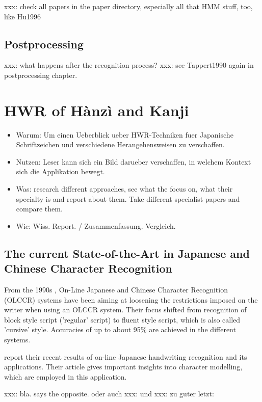 xxx: check all papers in the paper directory, especially all that HMM stuff,
too, like Hu1996

\subsection{Postprocessing}
\label{sec:postprocessing}

xxx: what happens after the recognition process?
xxx: see Tappert1990 again in postprocessing chapter.

\section{HWR of Hànzì and Kanji}
\begin{itemize}
\item Warum: Um einen Ueberblick ueber HWR-Techniken fuer Japanische 
  Schriftzeichen und verschiedene Herangehensweisen zu verschaffen.
\item Nutzen: Leser kann sich ein Bild darueber verschaffen,
  in welchem Kontext sich die Applikation bewegt.
\item Was: research different approaches, see what the focus on, 
  what their specialty is and report about them. Take different specialist 
  papers and compare them.
\item Wie: Wiss. Report. / Zusammenfassung. Vergleich. 
\end{itemize}

\subsection{The current State-of-the-Art in Japanese and Chinese Character Recognition}
From the 1990s  , On-Line Japanese and Chinese Character Recognition 
(OLCCR) systems have been aiming at loosening the restrictions imposed on 
the writer when using an OLCCR system. Their focus shifted from recognition 
of block style script ('regular' script) to fluent style script, 
which is also called 'cursive' style. Accuracies of up to about 95\% are
achieved in the different systems.

\cite{Nakagawa2008} report their recent results of on-line Japanese 
handwriting recognition and its applications. Their article gives 
important insights into character modelling, which are employed in 
this application.

xxx: bla.  says the opposite. \cite{ChenLee1996} oder auch 
xxx: \cite{Nakagawa2008} und \cite{Nakai2003} 
xxx: zu guter letzt: \cite{Santosh2009}

